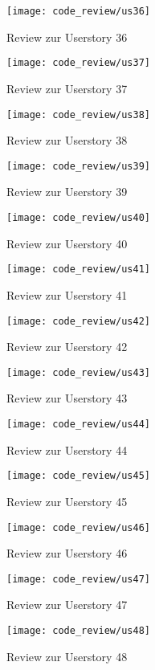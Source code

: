 \begin{figure}[H]
\centering
\texttt{[image: code\_review/us36]}
\caption{Review zur Userstory 36}
\end{figure}

\begin{figure}[H]
\centering
\texttt{[image: code\_review/us37]}
\caption{Review zur Userstory 37}
\end{figure}

\begin{figure}[H]
\centering
\texttt{[image: code\_review/us38]}
\caption{Review zur Userstory 38}
\end{figure}

\begin{figure}[H]
\centering
\texttt{[image: code\_review/us39]}
\caption{Review zur Userstory 39}
\end{figure}

\begin{figure}[H]
\centering
\texttt{[image: code\_review/us40]}
\caption{Review zur Userstory 40}
\end{figure}

\begin{figure}[H]
\centering
\texttt{[image: code\_review/us41]}
\caption{Review zur Userstory 41}
\end{figure}

\begin{figure}[H]
\centering
\texttt{[image: code\_review/us42]}
\caption{Review zur Userstory 42}
\end{figure}

\begin{figure}[H]
\centering
\texttt{[image: code\_review/us43]}
\caption{Review zur Userstory 43}
\end{figure}

\begin{figure}[H]
\centering
\texttt{[image: code\_review/us44]}
\caption{Review zur Userstory 44}
\end{figure}

\begin{figure}[H]
\centering
\texttt{[image: code\_review/us45]}
\caption{Review zur Userstory 45}
\end{figure}

\begin{figure}[H]
\centering
\texttt{[image: code\_review/us46]}
\caption{Review zur Userstory 46}
\end{figure}

\begin{figure}[H]
\centering
\texttt{[image: code\_review/us47]}
\caption{Review zur Userstory 47}
\end{figure}

\begin{figure}[H]
\centering
\texttt{[image: code\_review/us48]}
\caption{Review zur Userstory 48}
\end{figure}
